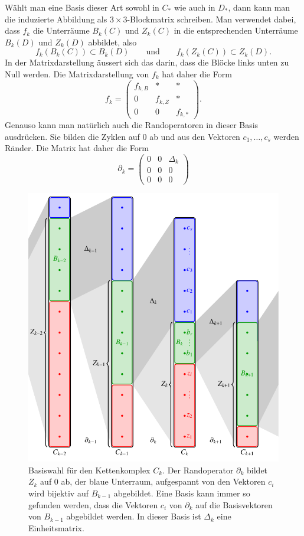 Wählt man eine Basis dieser Art sowohl in $C_*$ wie auch in $D_*$,
dann kann man die induzierte Abbildung als $3\times 3$-Blockmatrix
schreiben.
Man verwendet dabei, dass $f_k$ die Unterräume $B_k(C)$ und
$Z_k(C)$ in die entsprechenden Unterräume $B_k(D)$ und $Z_k(D)$
abbildet, also
\[
f_k(B_k(C)) \subset B_k(D)
\qquad\text{und}\qquad
f_k(Z_k(C)) \subset Z_k(D).
\]
In der Matrixdarstellung äussert sich das darin, dass die Blöcke
links unten zu Null werden.
Die Matrixdarstellung von $f_k$ hat daher die Form
\[
f_k
=
\begin{pmatrix}
f_{k,B} &    *    & * \\
   0    & f_{k,Z} & * \\
   0    &    0    & f_{k,*}
\end{pmatrix}.
\]
Genauso kann man natürlich auch die Randoperatoren in dieser Basis
ausdrücken.
Sie bilden die Zyklen auf $0$ ab und aus den Vektoren $c_1,\dots,c_s$
werden Ränder.
Die Matrix hat daher die Form
\[
\partial_k
=
\begin{pmatrix}
0& 0 & \Delta_k \\
0& 0 & 0 \\
0& 0 & 0
\end{pmatrix}
\]
\begin{figure}
\centering
\includegraphics{chapters/95-homologie/images/complexbasis.pdf}
\caption{Basiswahl für den Kettenkomplex $C_k$.
Der Randoperator $\partial_k$ bildet $Z_k$ auf $0$ ab, der blaue
Unterraum, aufgespannt von den Vektoren $c_i$ wird bijektiv auf $B_{k-1}$
abgebildet.
Eine Basis kann immer so gefunden werden, dass die Vektoren $c_i$ 
von $\partial_k$ auf die Basisvektoren von $B_{k-1}$ abgebildet werden.
In dieser Basis ist $\Delta_k$ eine Einheitsmatrix.
\label{buch:homologie:fig:komplexbasis}}
\end{figure}%
